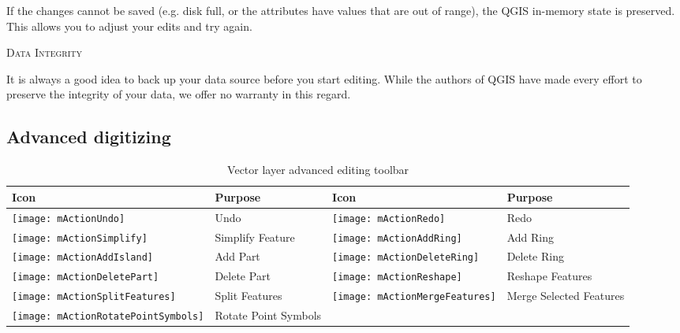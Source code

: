 If the changes cannot be saved (e.g. disk full, or the attributes have
values that are out of range), the QGIS in-memory state is preserved.  This
allows you to adjust your edits and try again.

\begin{Tip}[ht]\caption{\textsc{Data Integrity}}
It is always a good idea to back up your data source before you
start
editing. While the authors of QGIS have made every effort to preserve the
integrity of your data, we offer no warranty in this regard.
\end{Tip}

\subsection{Advanced digitizing}
\label{sec:advanced_edit}

\begin{table}[h]
\centering
\caption{Vector layer advanced editing toolbar}\label{tab:advanced_editing}\medskip
\small
\begin{tabular}{|l|p{6.9cm}|l|p{6.9cm}|}
\hline \textbf{Icon} & \textbf{Purpose} & \textbf{Icon} & \textbf{Purpose} \\
\hline \texttt{[image: mActionUndo]}
   & Undo 
   & \texttt{[image: mActionRedo]}
   & Redo \\
\hline \texttt{[image: mActionSimplify]}
   & Simplify Feature
   & \texttt{[image: mActionAddRing]}
   & Add Ring \\
\hline \texttt{[image: mActionAddIsland]}
   & Add Part
   & \texttt{[image: mActionDeleteRing]}
   & Delete Ring \\
\hline \texttt{[image: mActionDeletePart]}
   & Delete Part
   & \texttt{[image: mActionReshape]}
   & Reshape Features \\
\hline \texttt{[image: mActionSplitFeatures]}
   & Split Features
   & \texttt{[image: mActionMergeFeatures]}
   & Merge Selected Features \\
\hline \texttt{[image: mActionRotatePointSymbols]}
   & Rotate Point Symbols
   &
   & \\
\hline
\end{tabular}
\end{table}


